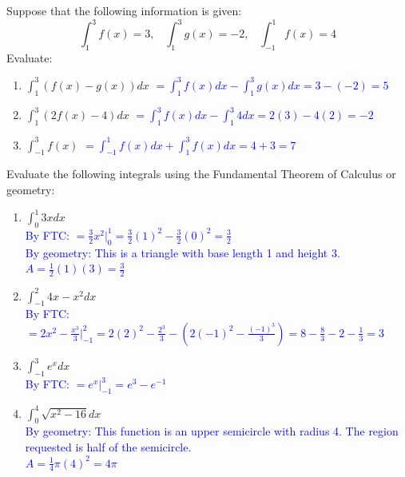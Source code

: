 \documentclass{ximera}
\begin{document}
\begin{exercise}
    Suppose that the following information is given: 
    $$\displaystyle \int_1^3 f(x)=3,\;\;\;\int_1^3 g(x)=-2,\;\;\; \int_{-1}^1 f(x)=4$$
    Evaluate:
    \begin{enumerate}
        \item $\displaystyle \int_1^3 (f(x)-g(x))dx$ \textcolor{blue}{ $=\displaystyle \int_1^3f(x)dx-\int_1^3g(x)dx=3-(-2)=5$}
        \item $\displaystyle \int_1^3 (2f(x)-4)dx$ \textcolor{blue}{ $\displaystyle=\int_1^3 f(x)dx-\int_1^3 4dx=2(3)-4(2)=-2$}
        \item $\displaystyle \int_{-1}^3 f(x)$ \textcolor{blue}{ $\displaystyle =\int_{-1}^1 f(x)dx+\int_1^3 f(x)dx=4+3=7$}
    \end{enumerate}

\end{exercise}

\begin{exercise}
    Evaluate the following integrals using the Fundamental Theorem of Calculus or geometry:
    \begin{enumerate}
        \item $\int_0^1 3xdx$\\
        \textcolor{blue}{By FTC: $=\frac{3}{2}x^2\bigg|_0^1=\frac{3}{2}(1)^2-\frac32(0)^2=\frac{3}{2}$\\
        By geometry: This is a triangle with base length 1 and height 3.  $A=\frac12(1)(3)=\frac{3}{2}$}
        \item $\int_{-1}^2 4x-x^2dx$\\
        \textcolor{blue}{By FTC: $=2x^2-\frac{x^3}{3}\bigg|_{-1}^2=2(2)^2-\frac{2^3}{3}-(2(-1)^2-\frac{(-1)^3}{3})=8-\frac83-2-\frac{1}{3}=3$}
        \item $\int_{-1}^3 e^xdx$\\
        \textcolor{blue}{By FTC: $=e^x\bigg|_{-1}^3=e^3-e^{-1}$}
        \item $\int_0^4 \sqrt{x^2-16}dx$\\
        \textcolor{blue}{By geometry: This function is an upper semicircle with radius 4.  The region requested is half of the semicircle.\\
        $A=\frac{1}{4}\pi (4)^2=4\pi$}
    \end{enumerate}
\end{exercise}
\end{document}

